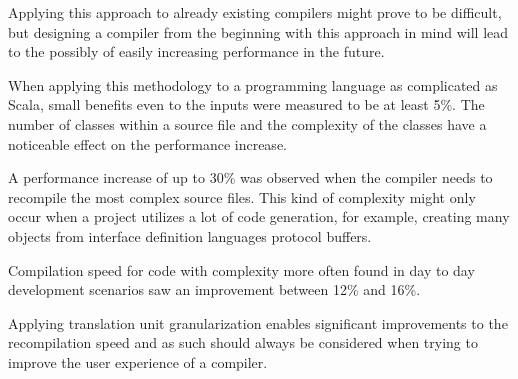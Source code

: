 \documentclass{VUMIFPSbakalaurinis}
\begin{document}
Applying this approach to already existing compilers might prove to be difficult, but designing a compiler from the beginning with this approach in mind will lead to the possibly of easily increasing performance in the future.

When applying this methodology to a programming language as complicated as Scala, small benefits even to the inputs were measured to be at least 5\%.
The number of classes within a source file and the complexity of the classes have a noticeable effect on the performance increase.

A performance increase of up to 30\% was observed when the compiler needs to recompile the most complex source files.
This kind of complexity might only occur when a project utilizes a lot of code generation, for example, creating many objects from interface definition languages protocol buffers.

Compilation speed for code with complexity more often found in day to day development scenarios saw an improvement between 12\% and 16\%.

Applying translation unit granularization enables significant improvements to the recompilation speed and as such should always be considered when trying to improve the user experience of a compiler.

\end{document}
